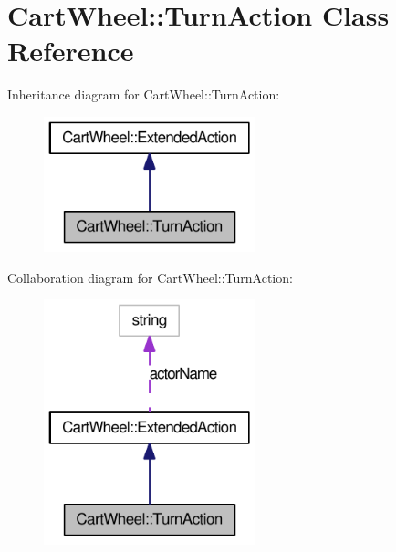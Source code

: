 \hypertarget{classCartWheel_1_1TurnAction}{
\section{CartWheel::TurnAction Class Reference}
\label{classCartWheel_1_1TurnAction}
}


Inheritance diagram for CartWheel::TurnAction:\nopagebreak
\begin{figure}[H]
\begin{center}
\leavevmode
\includegraphics[width=174pt]{classCartWheel_1_1TurnAction__inherit__graph}
\end{center}
\end{figure}


Collaboration diagram for CartWheel::TurnAction:\nopagebreak
\begin{figure}[H]
\begin{center}
\leavevmode
\includegraphics[width=174pt]{classCartWheel_1_1TurnAction__coll__graph}
\end{center}
\end{figure}
